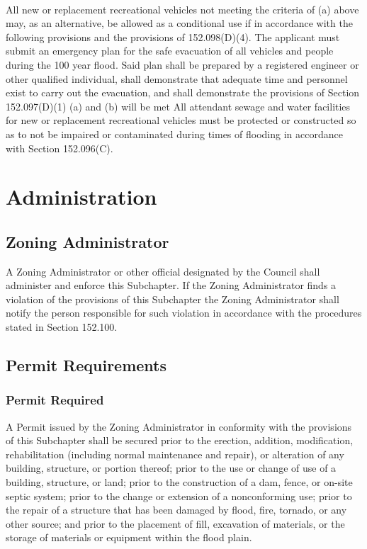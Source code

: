 \paragraph{}
All new or replacement recreational vehicles not meeting the criteria of (a) above may, as an alternative, be allowed as a conditional use if in accordance with the following provisions and the provisions of 152.098(D)(4). The applicant must submit an emergency plan for the safe evacuation of all vehicles and people during the 100 year flood. Said plan shall be prepared by a registered engineer or other qualified individual, shall demonstrate that adequate time and personnel exist to carry out the evacuation, and shall demonstrate the provisions of Section 152.097(D)(1) (a) and (b) will be met All attendant sewage and water facilities for new or replacement recreational vehicles must be protected or constructed so as to not be impaired or contaminated during times of flooding in accordance with Section 152.096(C).
\section{Administration}
\subsection{Zoning Administrator}
A Zoning Administrator or other official designated by the Council shall administer and enforce this Subchapter. If the Zoning Administrator finds a violation of the provisions of this Subchapter the Zoning Administrator shall notify the person responsible for such violation in accordance with the procedures stated in Section 152.100.
\subsection{Permit Requirements}
\subsubsection{Permit Required}
A Permit issued by the Zoning Administrator in conformity with the provisions of this Subchapter shall be secured prior to the erection, addition, modification, rehabilitation (including normal maintenance and repair), or alteration of any building, structure, or portion thereof; prior to the use or change of use of a building, structure, or land; prior to the construction of a dam, fence, or on-site septic system; prior to the change or extension of a nonconforming use; prior to the repair of a structure that has been damaged by flood, fire, tornado, or any other source; and prior to the placement of fill, excavation of materials, or the storage of materials or equipment within the flood plain.
